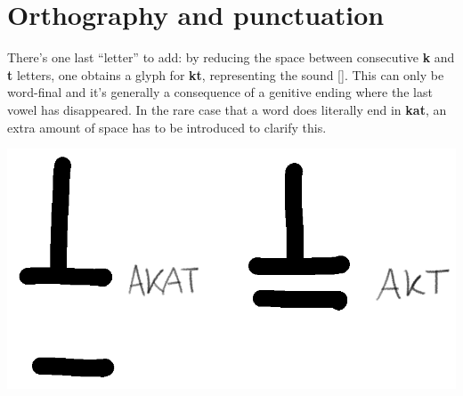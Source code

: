 \documentclass[10pt,oneside]{memoir}
\newcommand{\apa}[1]{[\textipa{#1}]}
\begin{document}
\pagebreak




\section{Orthography and punctuation}

\vfill

\begin{minipage}[]{0.5\textwidth}
    There's one last ``letter'' to add: by reducing the space between consecutive \textbf{k} and \textbf{t} letters, one obtains a glyph for \textbf{kt}, representing the sound \apa{kt}. This can only be word-final and it's generally a consequence of a genitive ending where the last vowel has disappeared. In the rare case that a word does literally end in \textbf{kat}, an extra amount of space has to be introduced to clarify this.
\end{minipage}
\hfill
\begin{minipage}[]{0.45 \textwidth}
    \centering
    \includegraphics{kt}
\end{minipage}

\vfill
\end{document}
